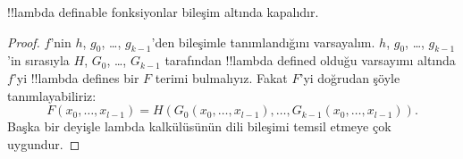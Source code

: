 


\begin{lem}
!!{lambda definable} fonksiyonlar bileşim altında kapalıdır.
\end{lem}

\begin{proof}
$f$'nin $h$, $g_0$, \dots, $g_{k-1}$'den bileşimle tanımlandığını
varsayalım. $h$, $g_0$, \dots, $g_{k-1}$'in sırasıyla $H$, $G_0$, \dots,
$G_{k-1}$ tarafından !!{lambda defined} olduğu varsayımı altında $f$'yi
!!{lambda define}s bir $F$ terimi bulmalıyız. Fakat $F$'yi doğrudan şöyle
tanımlayabiliriz:
\[
F(x_0, \dots, x_{l-1}) = H(G_0(x_0, \dots, x_{l-1}),
\dots, G_{k-1}(x_0, \dots, x_{l-1})).
\]
Başka bir deyişle lambda kalkülüsünün dili bileşimi temsil etmeye çok
uygundur.
\end{proof}

